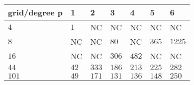 \begin{tabular}{lllllll}
\hline
 grid/degree p   & 1    & 2     & 3     & 4     & 5     & 6      \\
\hline
 $4$             & $1$  & NC    & NC    & NC    & NC    & NC     \\
 $8$             & NC   & NC    & $80$  & NC    & $365$ & $1225$ \\
 $16$            & NC   & NC    & $306$ & $482$ & NC    & NC     \\
 $44$            & $42$ & $333$ & $186$ & $213$ & $225$ & $282$  \\
 $101$           & $49$ & $171$ & $131$ & $136$ & $148$ & $250$  \\
\hline
\end{tabular}